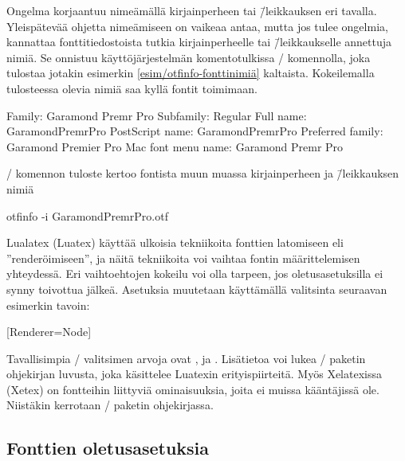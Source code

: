 Ongelma korjaantuu nimeämällä kirjainperheen tai \=/leikkauksen eri
tavalla. Yleispätevää ohjetta nimeämiseen on vaikeaa antaa, mutta jos
tulee ongelmia, kannattaa fonttitiedostoista tutkia kirjainperheelle tai
\=/leikkaukselle annettuja nimiä. Se onnistuu käyttöjärjestelmän
komentotulkissa \-/ komennolla, joka tulostaa jotakin
esimerkin \ref{esim/otfinfo-fonttinimiä} kaltaista. Kokeilemalla
tulosteessa olevia nimiä saa kyllä fontit toimimaan.

\begin{esimerkki*}
\begin{koodilohko}
Family:              Garamond Premr Pro
Subfamily:           Regular
Full name:           GaramondPremrPro
PostScript name:     GaramondPremrPro
Preferred family:    Garamond Premier Pro
Mac font menu name:  Garamond Premr Pro
\end{koodilohko}
  \caption{\-/ komennon tuloste kertoo fontista muun
    muassa kirjainperheen ja \=/leikkauksen nimiä}
  \label{esim/otfinfo-fonttinimiä}
\end{esimerkki*}

\begin{koodilohkosis}
otfinfo -i GaramondPremrPro.otf
\end{koodilohkosis}

\noindent
Lualatex (Luatex) käyttää ulkoisia tekniikoita fonttien latomiseen eli
''renderöimiseen'', ja näitä tekniikoita voi vaihtaa fontin
määrittelemisen yhteydessä. Eri vaihtoehtojen kokeilu voi olla tarpeen,
jos oletusasetuksilla ei synny toivottua jälkeä. Asetuksia muutetaan
käyttämällä valitsinta  seuraavan esimerkin tavoin:

\begin{koodilohkosis}
\setmainfont{…}[Renderer=Node]
\end{koodilohkosis}

\noindent
Tavallisimpia \-/ valitsimen arvoja ovat
,  ja .
Lisätietoa voi lukea \-/ paketin ohjekirjan luvusta,
joka käsittelee Luatexin erityispiirteitä. Myös Xelatexissa (Xetex) on
fontteihin liittyviä ominaisuuksia, joita ei muissa kääntäjissä ole.
Niistäkin kerrotaan \-/ paketin ohjekirjassa.

\subsection{Fonttien oletusasetuksia}
\label{luku/fontit-oletusasetukset}


